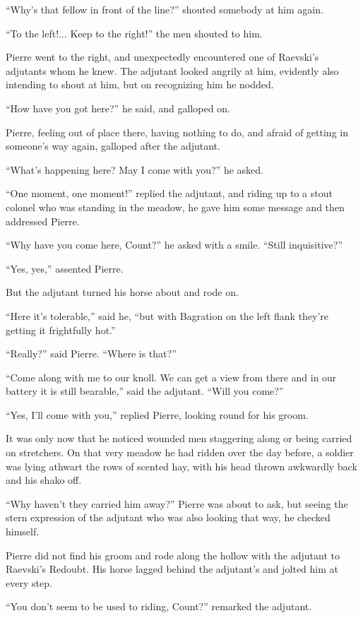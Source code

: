 ``Why's that fellow in front of the line?'' shouted somebody at
him again.

``To the left!... Keep to the right!'' the men shouted to him.

Pierre went to the right, and unexpectedly encountered one of
Raev\-ski's adjutants whom he knew. The adjutant looked angrily at
him, evidently also intending to shout at him, but on recognizing
him he nodded.

``How have you got here?'' he said, and galloped on.

Pierre, feeling out of place there, having nothing to do, and
afraid of getting in someone's way again, galloped after the
adjutant.

``What's happening here? May I come with you?'' he asked.

``One moment, one moment!'' replied the adjutant, and riding up
to a stout colonel who was standing in the meadow, he gave him
some message and then addressed Pierre.

``Why have you come here, Count?'' he asked with a smile. ``Still
inquisitive?''

``Yes, yes,'' assented Pierre.

But the adjutant turned his horse about and rode on.

``Here it's tolerable,'' said he, ``but with Bagration on the
left flank they're getting it frightfully hot.''

``Really?'' said Pierre. ``Where is that?''

``Come along with me to our knoll. We can get a view from there
and in our battery it is still bearable,'' said the
adjutant. ``Will you come?''

``Yes, I'll come with you,'' replied Pierre, looking round for
his groom.

It was only now that he noticed wounded men staggering along or
being carried on stretchers. On that very meadow he had ridden
over the day before, a soldier was lying athwart the rows of
scented hay, with his head thrown awkwardly back and his shako
off.

``Why haven't they carried him away?'' Pierre was about to ask,
but seeing the stern expression of the adjutant who was also
looking that way, he checked himself.

Pierre did not find his groom and rode along the hollow with the
adjutant to Raevski's Redoubt. His horse lagged behind the
adjutant's and jolted him at every step.

``You don't seem to be used to riding, Count?'' remarked the
adjutant.

